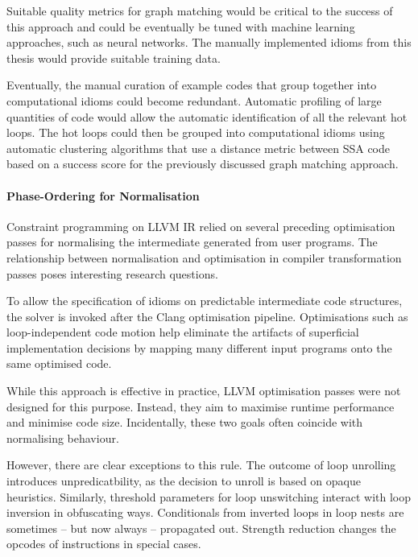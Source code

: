     Suitable quality metrics for graph matching would be critical to the success
    of this approach and could be eventually be tuned with machine learning
    approaches, such as neural networks.
    The manually implemented idioms from this thesis would provide suitable
    training data.

    Eventually, the manual curation of example codes that group together into
    computational idioms could become redundant.
    Automatic profiling of large quantities of code would allow the automatic
    identification of all the relevant hot loops.
    The hot loops could then be grouped into computational idioms using
    automatic clustering algorithms that use a distance metric between SSA code
    based on a success score for the previously discussed graph matching
    approach.

    \paragraph*{Phase-Ordering for Normalisation}
    Constraint programming on LLVM IR relied on several preceding optimisation
    passes for normalising the intermediate generated from user programs.
    The relationship between normalisation and optimisation in compiler
    transformation passes poses interesting research questions.

    To allow the specification of idioms on predictable intermediate code
    structures, the solver is invoked after the Clang optimisation pipeline.
    Optimisations such as loop-independent code motion help eliminate the
    artifacts of superficial implementation decisions by mapping many different
    input programs onto the same optimised code.

    While this approach is effective in practice, LLVM optimisation passes were
    not designed for this purpose.
    Instead, they aim to maximise runtime performance and minimise code size.
    Incidentally, these two goals often coincide with normalising behaviour.

    However, there are clear exceptions to this rule.
    The outcome of loop unrolling introduces unpredicatbility, as the decision
    to unroll is based on opaque heuristics.
    Similarly, threshold parameters for loop unswitching interact with loop
    inversion in obfuscating ways.
    Conditionals from inverted loops in loop nests are sometimes -- but
    now always -- propagated out.
    Strength reduction changes the opcodes of instructions in special cases.

